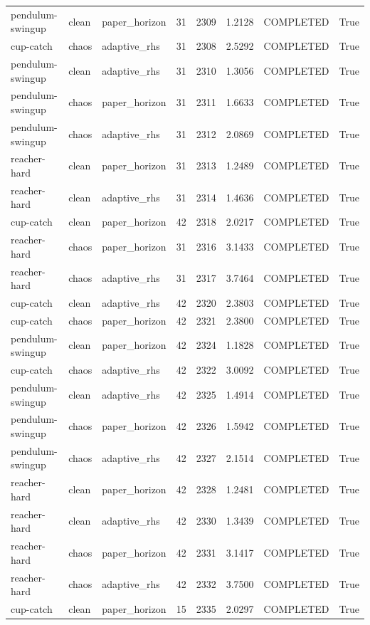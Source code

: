 \begin{tabular}{llllllll}
pendulum-swingup & clean & paper\_horizon & 31 & 2309 & 1.2128 & COMPLETED & True \\
cup-catch & chaos & adaptive\_rhs & 31 & 2308 & 2.5292 & COMPLETED & True \\
pendulum-swingup & clean & adaptive\_rhs & 31 & 2310 & 1.3056 & COMPLETED & True \\
pendulum-swingup & chaos & paper\_horizon & 31 & 2311 & 1.6633 & COMPLETED & True \\
pendulum-swingup & chaos & adaptive\_rhs & 31 & 2312 & 2.0869 & COMPLETED & True \\
reacher-hard & clean & paper\_horizon & 31 & 2313 & 1.2489 & COMPLETED & True \\
reacher-hard & clean & adaptive\_rhs & 31 & 2314 & 1.4636 & COMPLETED & True \\
cup-catch & clean & paper\_horizon & 42 & 2318 & 2.0217 & COMPLETED & True \\
reacher-hard & chaos & paper\_horizon & 31 & 2316 & 3.1433 & COMPLETED & True \\
reacher-hard & chaos & adaptive\_rhs & 31 & 2317 & 3.7464 & COMPLETED & True \\
cup-catch & clean & adaptive\_rhs & 42 & 2320 & 2.3803 & COMPLETED & True \\
cup-catch & chaos & paper\_horizon & 42 & 2321 & 2.3800 & COMPLETED & True \\
pendulum-swingup & clean & paper\_horizon & 42 & 2324 & 1.1828 & COMPLETED & True \\
cup-catch & chaos & adaptive\_rhs & 42 & 2322 & 3.0092 & COMPLETED & True \\
pendulum-swingup & clean & adaptive\_rhs & 42 & 2325 & 1.4914 & COMPLETED & True \\
pendulum-swingup & chaos & paper\_horizon & 42 & 2326 & 1.5942 & COMPLETED & True \\
pendulum-swingup & chaos & adaptive\_rhs & 42 & 2327 & 2.1514 & COMPLETED & True \\
reacher-hard & clean & paper\_horizon & 42 & 2328 & 1.2481 & COMPLETED & True \\
reacher-hard & clean & adaptive\_rhs & 42 & 2330 & 1.3439 & COMPLETED & True \\
reacher-hard & chaos & paper\_horizon & 42 & 2331 & 3.1417 & COMPLETED & True \\
reacher-hard & chaos & adaptive\_rhs & 42 & 2332 & 3.7500 & COMPLETED & True \\
cup-catch & clean & paper\_horizon & 15 & 2335 & 2.0297 & COMPLETED & True \\

\end{tabular}

